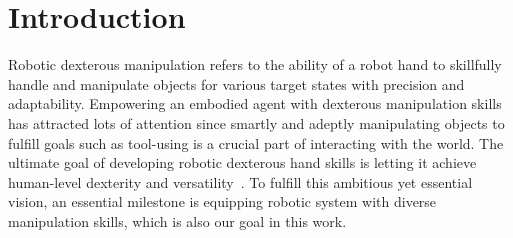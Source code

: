 \section{Introduction}








Robotic dexterous manipulation refers to the ability of a robot hand to skillfully handle and manipulate objects for various target states with precision and adaptability.
Empowering an embodied agent with dexterous manipulation skills has attracted lots of attention since smartly and adeptly manipulating objects to fulfill goals such as tool-using is a crucial part of interacting with the world. 
The ultimate goal of developing robotic dexterous hand skills is letting it achieve human-level dexterity and versatility~\citep{rajeswaran2017learning,chen2023visual,chen2021system,akkaya2019solving,christen2022d,zhang2023artigrasp,qin2022dexmv,liu2022herd,wu2023learning,gupta2016learning,wang2023physhoi,mordatch2012contact,liu2024quasisim,Li2024ReinforcementLF}. To fulfill this ambitious yet essential vision, an essential milestone is equipping robotic system with diverse manipulation skills, which is also our goal in this work. 

